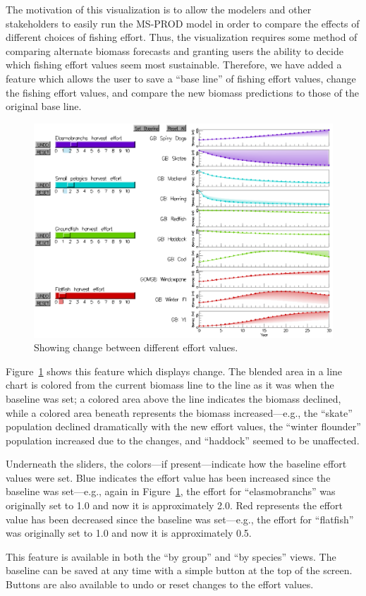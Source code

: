 The motivation of this visualization is to allow the modelers and other stakeholders to easily run the MS-PROD model in order to compare the effects of different choices of fishing effort.  Thus, the visualization requires some method of comparing alternate biomass forecasts and granting users the ability to decide which fishing effort values seem most sustainable.  Therefore, we have added a feature which allows the user to save a ``base line'' of fishing effort values, change the fishing effort values, and compare the new biomass predictions to those of the original base line.

\begin{figure}[h]
	\centering
	\includegraphics[width=12cm]{figures/eps/msprod_change.eps}
	\caption{Showing change between different effort values.}
	\label{fig:msprod_change}
\end{figure}

Figure~\ref{fig:msprod_change} shows this feature which displays change.  The blended area in a line chart is colored from the current biomass line to the line as it was when the baseline was set; a colored area above the line indicates the biomass declined, while a colored area beneath represents the biomass increased---e.g., the ``skate'' population declined dramatically with the new effort values, the ``winter flounder'' population increased due to the changes, and ``haddock'' seemed to be unaffected.

Underneath the sliders, the colors---if present---indicate how the baseline effort values were set.  Blue indicates the effort value has been increased since the baseline was set---e.g., again in Figure~\ref{fig:msprod_change}, the effort for ``elasmobranchs'' was originally set to 1.0 and now it is approximately 2.0.  Red represents the effort value has been decreased since the baseline was set---e.g., the effort for ``flatfish'' was originally set to 1.0 and now it is approximately 0.5.

This feature is available in both the ``by group'' and ``by species'' views.  The baseline can be saved at any time with a simple button at the top of the screen.  Buttons are also available to undo or reset changes to the effort values.
